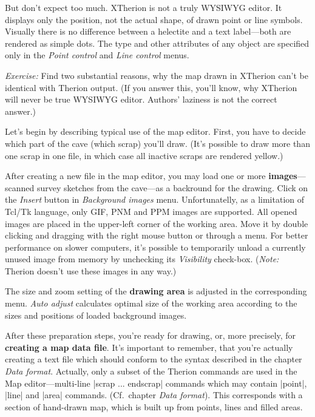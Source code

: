 But don't expect too much. XTherion is not a truly WYSIWYG editor. It 
displays only the position, not the actual shape, of drawn point or line 
symbols. Visually there is no difference between a helectite and a text 
label---both are rendered as simple dots. The type and other attributes of any 
object are specified only in the {\it Point control} and {\it Line control} menus.


\ifx\pdfoutput\undefined\else
\leavevmode{}\fi
{\it Exercise:} Find two substantial reasons, why the map drawn in XTherion can't be 
identical with Therion output. (If you answer this, you'll know, why XTherion 
will never be true WYSIWYG editor. Authors' laziness is not the correct 
answer.)

Let's begin by describing typical use of the map editor. First, you have 
to decide which part of the cave (which scrap) you'll draw. (It's possible to 
draw more than one scrap in one file, in which case all inactive scraps are rendered 
yellow.)

After creating a new file in the map editor, you may load one or more 
{\bf images}---scanned survey sketches from the cave---as a backround for 
the drawing. Click on the {\it Insert} button in {\it Background images} menu.
Unfortunatelly, as a limitation of Tcl/Tk language, only GIF, PNM and PPM 
images are supported. All opened images are placed in the upper-left corner of 
the working area. Move it by double clicking and dragging with the right 
mouse button or through a menu. For better performance on slower computers, 
it's possible to temporarily unload a currently unused image from memory 
by unchecking its {\it Visibility} check-box. ({\it Note:} Therion doesn't
use these images in any way.)

The size and zoom setting of the {\bf drawing area} is adjusted in the 
corresponding menu. {\it Auto adjust} calculates optimal size of the working 
area according to the sizes and positions of loaded background images.

After these preparation steps, you're ready for drawing, or, more 
precisely, for {\bf creating a map data file}. It's important to remember, 
that you're actually creating a text file which should conform to the syntax 
described in the chapter {\it Data format}. Actually, only a subset of the 
Therion commands are used in the Map editor---multi-line |scrap ... endscrap|
commands which may contain |point|, |line| and |area| commands. (Cf.~chapter 
{\it Data format}). This corresponds with a section of hand-drawn map, which is 
built up from points, lines and filled areas.

